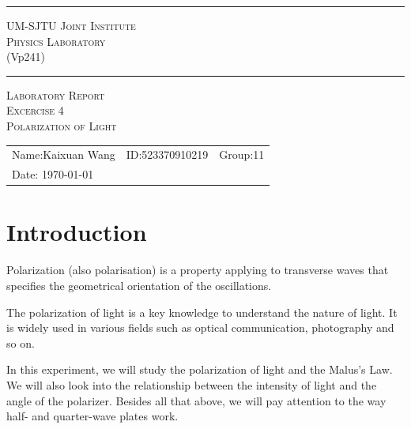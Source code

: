 \documentclass[12pt, a4paper, oneside]{article}
\begin{document}
\begin{center}
	\rule{\textwidth}{1pt}\par
	\vspace{5mm}
	{\large\scshape UM-SJTU Joint Institute}\\[\baselineskip]
	{\large\scshape Physics Laboratory}\\
	(Vp241)
	\rule{\textwidth}{1pt}\par
	\vspace{4cm}
	{\large\scshape Laboratory Report}\\[\baselineskip]
	{\large\scshape Excercise 4}\\[\baselineskip]
	{\large\scshape Polarization of Light}\\[\baselineskip]
\end{center}
\vspace{7cm}

\begin{tabular}{lll}
	Name:Kaixuan Wang & ID:523370910219 & Group:11 \\
	Date: {\today}    &                 &         \\
\end{tabular}


\rightline{\footnotesize[rev4.1]}
\pagebreak

\section{Introduction}
\indent

Polarization (also polarisation) is a property applying to transverse waves that specifies
the geometrical orientation of the oscillations.

The polarization of light is a key knowledge to understand the nature of light. It is widely used in various fields such 
as optical communication, photography and so on.

In this experiment, we will study the polarization of light and the Malus's Law. 
We will also look into the relationship between the intensity of light and the angle of the polarizer. 
Besides all that above, we will pay attention to the way half- and quarter-wave plates work.
\end{document}

